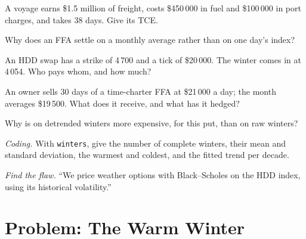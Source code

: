 \begin{exercise}[$\star$]\label{exo:m3:freight-weather-and-other-corners:2}
A voyage earns \$1.5 million of freight, costs \$450\,000 in fuel and \$100\,000 in port charges, and takes
38 days. Give its TCE.
\end{exercise}

\begin{exercise}[$\star$]\label{exo:m3:freight-weather-and-other-corners:3}
Why does an FFA settle on a monthly average rather than on one day's index?
\end{exercise}

\begin{exercise}[$\star\star$]\label{exo:m3:freight-weather-and-other-corners:4}
An HDD swap has a strike of 4\,700 and a tick of \$20\,000. The winter comes in at 4\,054. Who pays whom,
and how much?
\end{exercise}

\begin{exercise}[$\star\star$]\label{exo:m3:freight-weather-and-other-corners:5}
An owner sells 30 days of a time-charter FFA at \$21\,000 a day; the month averages \$19\,500. What does it
receive, and what has it hedged?
\end{exercise}

\begin{exercise}[$\star\star$]\label{exo:m3:freight-weather-and-other-corners:6}
Why is  on detrended winters more expensive, for this put, than on raw winters?
\end{exercise}

\begin{exercise}[$\star\star\star$]\label{exo:m3:freight-weather-and-other-corners:7}
\emph{Coding.} With \texttt{winters}, give the number of complete winters, their mean and standard deviation,
the warmest and coldest, and the fitted trend per decade.
\end{exercise}

\begin{exercise}[$\star\star\star$]\label{exo:m3:freight-weather-and-other-corners:8}
\emph{Find the flaw.} ``We price weather options with Black--Scholes on the HDD index, using its historical
volatility.''
\end{exercise}

\section{Problem: The Warm Winter}

